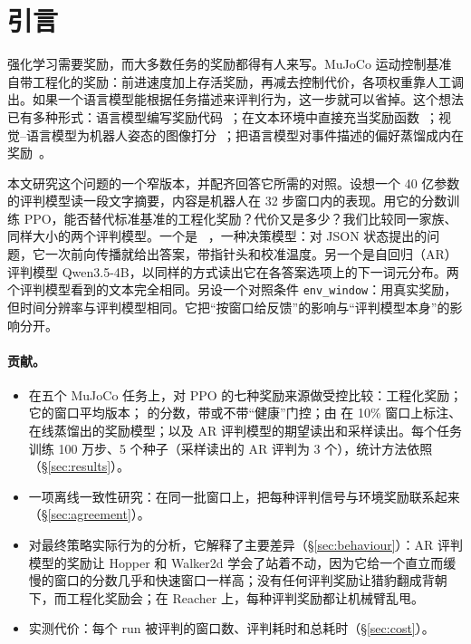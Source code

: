
\section{引言}\label{sec:intro}

强化学习需要奖励，而大多数任务的奖励都得有人来写。MuJoCo 运动控制基准自带工程化的奖励：前进速度加上存活奖励，再减去控制代价，各项权重靠人工调出。如果一个语言模型能根据任务描述来评判行为，这一步就可以省掉。这个想法已有多种形式：语言模型编写奖励代码~\cite{yu2023language,ma2024eureka}；在文本环境中直接充当奖励函数~\cite{kwon2023reward}；视觉--语言模型为机器人姿态的图像打分~\cite{rocamonde2024vlm}；把语言模型对事件描述的偏好蒸馏成内在奖励~\cite{klissarov2024motif}。

本文研究这个问题的一个窄版本，并配齐回答它所需的对照。设想一个 40 亿参数的评判模型读一段文字摘要，内容是机器人在 32 步窗口内的表现。用它的分数训练 PPO，能否替代标准基准的工程化奖励？代价又是多少？我们比较同一家族、同样大小的两个评判模型。一个是 \kev{}~\cite{kev4b}，一种决策模型：对 JSON 状态提出的问题，它一次前向传播就给出答案，带指针头和校准温度。另一个是自回归（AR）评判模型 Qwen3.5-4B，以同样的方式读出它在各答案选项上的下一词元分布。两个评判模型看到的文本完全相同。另设一个对照条件 \texttt{env\_window}：用真实奖励，但时间分辨率与评判模型相同。它把“按窗口给反馈”的影响与“评判模型本身”的影响分开。

\paragraph{贡献。}
\begin{itemize}
\item 在五个 MuJoCo 任务上，对 PPO 的七种奖励来源做受控比较：工程化奖励；它的窗口平均版本；\kev{} 的分数，带或不带“健康”门控；由 \kev{} 在 10\% 窗口上标注、在线蒸馏出的奖励模型；以及 AR 评判模型的期望读出和采样读出。每个任务训练 100 万步、5 个种子（采样读出的 AR 评判为 3 个），统计方法依照 \citet{agarwal2021deep}（\S\ref{sec:results}）。
\item 一项离线一致性研究：在同一批窗口上，把每种评判信号与环境奖励联系起来（\S\ref{sec:agreement}）。
\item 对最终策略实际行为的分析，它解释了主要差异（\S\ref{sec:behaviour}）：AR 评判模型的奖励让 Hopper 和 Walker2d 学会了站着不动，因为它给一个直立而缓慢的窗口的分数几乎和快速窗口一样高；没有任何评判奖励让猎豹翻成背朝下，而工程化奖励会；在 Reacher 上，每种评判奖励都让机械臂乱甩。
\item 实测代价：每个 run 被评判的窗口数、评判耗时和总耗时（\S\ref{sec:cost}）。
\end{itemize}

